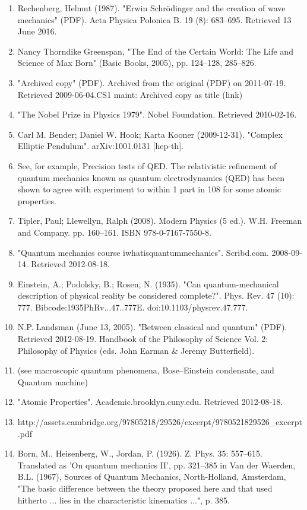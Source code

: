 \begin{enumerate}
\item Rechenberg, Helmut (1987). "Erwin Schrödinger and the creation of wave mechanics" (PDF). Acta Physica Polonica B. 19 (8): 683–695. Retrieved 13 June 2016.
\item Nancy Thorndike Greenspan, "The End of the Certain World: The Life and Science of Max Born" (Basic Books, 2005), pp. 124–128, 285–826.
\item "Archived copy" (PDF). Archived from the original (PDF) on 2011-07-19. Retrieved 2009-06-04.CS1 maint: Archived copy as title (link)
\item "The Nobel Prize in Physics 1979". Nobel Foundation. Retrieved 2010-02-16.
\item Carl M. Bender; Daniel W. Hook; Karta Kooner (2009-12-31). "Complex Elliptic Pendulum". arXiv:1001.0131 [hep-th].
\item See, for example, Precision tests of QED. The relativistic refinement of quantum mechanics known as quantum electrodynamics (QED) has been shown to agree with experiment to within 1 part in 108 for some atomic properties.
\item Tipler, Paul; Llewellyn, Ralph (2008). Modern Physics (5 ed.). W.H. Freeman and Company. pp. 160–161. ISBN 978-0-7167-7550-8.
\item "Quantum mechanics course iwhatisquantummechanics". Scribd.com. 2008-09-14. Retrieved 2012-08-18.
\item Einstein, A.; Podolsky, B.; Rosen, N. (1935). "Can quantum-mechanical description of physical reality be considered complete?". Phys. Rev. 47 (10): 777. Bibcode:1935PhRv...47..777E. doi:10.1103/physrev.47.777.
\item N.P. Landsman (June 13, 2005). "Between classical and quantum" (PDF). Retrieved 2012-08-19. Handbook of the Philosophy of Science Vol. 2: Philosophy of Physics (eds. John Earman & Jeremy Butterfield).
\item (see macroscopic quantum phenomena, Bose–Einstein condensate, and Quantum machine)
\item "Atomic Properties". Academic.brooklyn.cuny.edu. Retrieved 2012-08-18.
\item http://assets.cambridge.org/97805218/29526/excerpt/9780521829526_excerpt.pdf
\item Born, M., Heisenberg, W., Jordan, P. (1926). Z. Phys. 35: 557–615. Translated as 'On quantum mechanics II', pp. 321–385 in Van der Waerden, B.L. (1967), Sources of Quantum Mechanics, North-Holland, Amsterdam, "The basic difference between the theory proposed here and that used hitherto ... lies in the characteristic kinematics ...", p. 385.

\end{enumerate}
